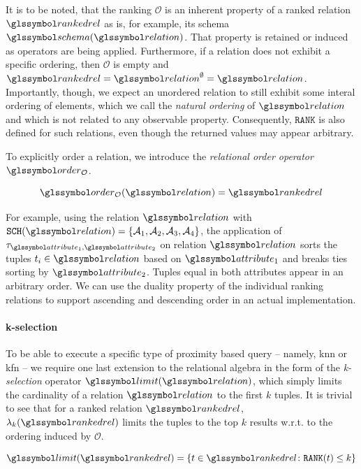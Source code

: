 It is to be noted, that the ranking $\mathcal{O}$ is an inherent property of a ranked relation $\rankedrel$ as is, for example, its schema $\schema(\relation)$. That property is retained or induced as operators are being applied. Furthermore, if a relation does not exhibit a specific ordering, then $\mathcal{O}$ is empty and $\rankedrel = \relation^{\emptyset} = \relation$. Importantly, though, we expect an unordered relation to still exhibit some interal ordering of elements, which we call the \emph{natural ordering} of $\relation$ and which is not related to any observable property. Consequently, $\mathtt{RANK}$ is also defined for such relations, even though the returned values may appear arbitrary.

To explicitly order a relation, we introduce the \emph{relational order operator} $\order_{\mathcal{O}}$.

\begin{equation}
    \label{equation:rel_alg_tau}
    \order_{\mathcal{O}}(\relation) = \rankedrel
\end{equation}

For example, using the relation $\relation$ with $\mathtt{SCH}(\relation) = \{ \mathcal{A}_1, \mathcal{A}_2, \mathcal{A}_3, \mathcal{A}_4 \}$, the application of $\tau_{\attribute_1,\attribute_2}$ on relation $\relation$ sorts the tuples $t_i \in \relation$ based on $\attribute_1$ and breaks ties sorting by $\attribute_2$. Tuples equal in both attributes appear in an arbitrary order. We can use the duality property of the individual ranking relations to support ascending and descending order in an actual implementation.

\paragraph{k-selection}

To be able to execute a specific type of proximity based query -- namely, \acrshort{knn} or \acrshort{kfn} -- we require one last extension to the relational algebra in the form of the \emph{k-selection} operator $\limit(\relation)$, which simply limits the cardinality of a relation $\relation$ to the first $k$ tuples. It is trivial to see that for a ranked relation $\rankedrel$, $\lambda_k(\rankedrel)$ limits the tuples to the top $k$ results w.r.t. to the ordering induced by $\mathcal{O}$.

\begin{equation}
    \limit(\rankedrel) = \{ t \in \rankedrel \colon \mathtt{RANK}(t) \leq k \}
\end{equation}

